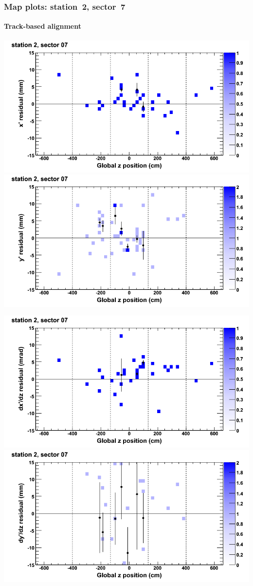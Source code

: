 \documentclass[compress]{beamer}
\begin{document}
\begin{frame}
\frametitle{Map plots: station~2, sector~7}
\framesubtitle{Track-based alignment}
\includegraphics[width=0.5\linewidth]{mapplots_re05/DTvsz_st2sec07_x.png}
\includegraphics[width=0.5\linewidth]{mapplots_re05/DTvsz_st2sec07_y.png}

\includegraphics[width=0.5\linewidth]{mapplots_re05/DTvsz_st2sec07_dxdz.png}
\includegraphics[width=0.5\linewidth]{mapplots_re05/DTvsz_st2sec07_dydz.png}
\end{frame}
\end{document}
